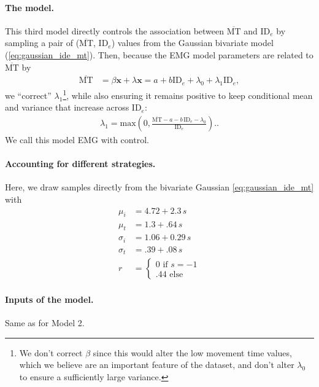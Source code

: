 \documentclass[acmlarge, manuscript,review]{acmart}
\newcommand{\mmt}{\ensuremath{\overline{\mt}}\xspace}
\newcommand{\mt}{\ensuremath{{\text{MT}}}\xspace}
\newcommand{\ide}{\ensuremath{{\text{ID}_e}}\xspace}
\begin{document}
\paragraph{The model.} This third model directly controls the association between \mmt and \ide by sampling a pair of (\mmt, \ide) values from the Gaussian bivariate model (\autoref{eq:gaussian_ide_mt}).
Then, because the EMG model parameters are related to \mmt by
\begin{align}
  \mmt & = \beta \mathbf{x} + \lambda \mathbf{x} = a + b \ide + \lambda_0 + \lambda_1 \ide,
\end{align}
we ``correct'' $\lambda_1$\footnote{We don't correct $\beta$ since this would alter the low movement time values, which we believe are an important feature of the dataset, and don't alter $\lambda_0$ to ensure a sufficiently large variance.}, while also ensuring it remains positive to keep conditional mean and variance that increase across \ide:
\begin{align}
  \lambda_1 = \text{max}(0, \frac{\mmt - a - b\,\ide - \lambda_0}{\ide}). \label{eq:lambda_1}.
\end{align}
We call this model EMG with control.

\paragraph{Accounting for different strategies.} Here, we draw samples directly from the bivariate Gaussian \autoref{eq:gaussian_ide_mt} with
\begin{align}
  \mu_i    & = 4.72 + 2.3\,s        \\
  \mu_t    & = 1.3 + .64\,s         \\
  \sigma_i & = 1.06 + 0.29\,s       \\
  \sigma_t & = .39 + .08\,s         \\
  r        & =
  \begin{cases}
    0 \text{ if } s = -1 \\
    .44 \text{ else}
  \end{cases}
\end{align}

\paragraph{Inputs of the model.} Same as for Model 2.
\end{document}
